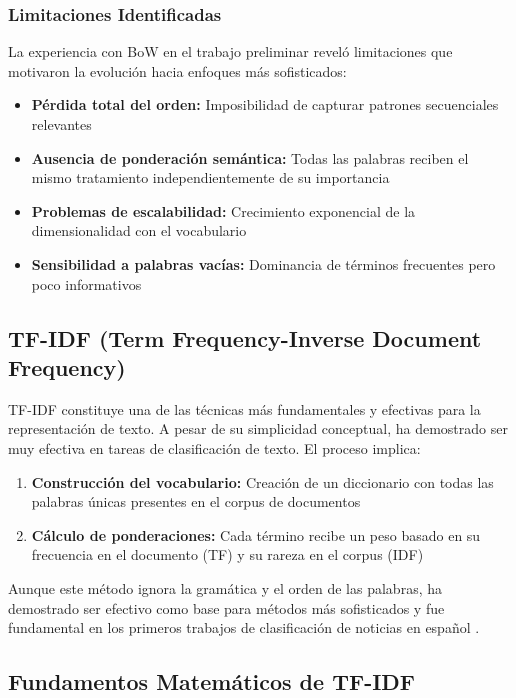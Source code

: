 \subsubsection{Limitaciones Identificadas}

La experiencia con BoW en el trabajo preliminar \cite{hurtado2024calibracion} reveló limitaciones que motivaron la evolución hacia enfoques más sofisticados:
\begin{itemize}
    \item \textbf{Pérdida total del orden:} Imposibilidad de capturar patrones secuenciales relevantes
    \item \textbf{Ausencia de ponderación semántica:} Todas las palabras reciben el mismo tratamiento independientemente de su importancia
    \item \textbf{Problemas de escalabilidad:} Crecimiento exponencial de la dimensionalidad con el vocabulario
    \item \textbf{Sensibilidad a palabras vacías:} Dominancia de términos frecuentes pero poco informativos
\end{itemize}

\subsection{TF-IDF (Term Frequency-Inverse Document Frequency)}

TF-IDF constituye una de las técnicas más fundamentales y efectivas para la representación de texto. A pesar de su simplicidad conceptual, ha demostrado ser muy efectiva en tareas de clasificación de texto. El proceso implica:

\begin{enumerate}
    \item \textbf{Construcción del vocabulario:} Creación de un diccionario con todas las palabras únicas presentes en el corpus de documentos
    \item \textbf{Cálculo de ponderaciones:} Cada término recibe un peso basado en su frecuencia en el documento (TF) y su rareza en el corpus (IDF)
\end{enumerate}

Aunque este método ignora la gramática y el orden de las palabras, ha demostrado ser efectivo como base para métodos más sofisticados y fue fundamental en los primeros trabajos de clasificación de noticias en español \cite{acosta2019construccion}.

\subsection{Fundamentos Matemáticos de TF-IDF}

